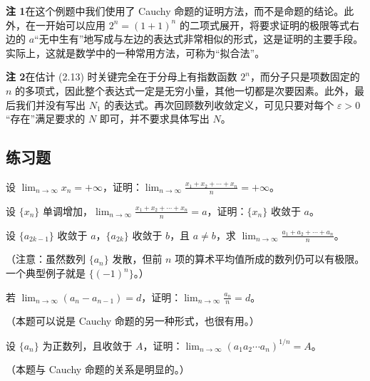 \begin{xremark}
\textbf{注 1}\quad 在这个例题中我们使用了 Cauchy 命题的证明方法，而不是命题的结论。此外，在一开始可以应用 $2^n=(1+1)^n$ 的二项式展开，将要求证明的极限等式右边的 $a$“无中生有”地写成与左边的表达式非常相似的形式，这是证明的主要手段。实际上，这就是数学中的一种常用方法，可称为“拟合法”。

\textbf{注 2}\quad 在估计 (2.13) 时关键完全在于分母上有指数函数 $2^n$，而分子只是项数固定的 $n$ 的多项式，因此整个表达式一定是无穷小量，其他一切都是次要因素。此外，最后我们并没有写出 $N_1$ 的表达式。再次回顾数列收敛定义，可见只要对每个 $\varepsilon>0$“存在”满足要求的 $N$ 即可，并不要求具体写出 $N$。
\end{xremark}

\subsection{练习题}

\begin{xexercise}[1]
设 $\displaystyle\lim_{n\to\infty}x_n=+\infty$，证明：$\displaystyle\lim_{n\to\infty}\frac{x_1+x_2+\cdots+x_n}{n}=+\infty$。
\end{xexercise}

\begin{xexercise}[2]
设 $\{x_n\}$ 单调增加，$\displaystyle\lim_{n\to\infty}\frac{x_1+x_2+\cdots+x_n}{n}=a$，证明：$\{x_n\}$ 收敛于 $a$。
\end{xexercise}

\begin{xexercise}[3]
设 $\{a_{2k-1}\}$ 收敛于 $a$，$\{a_{2k}\}$ 收敛于 $b$，且 $a\ne b$，求 $\displaystyle\lim_{n\to\infty}\frac{a_1+a_2+\cdots+a_n}{n}$。

  （注意：虽然数列 $\{a_n\}$ 发散，但前 $n$ 项的算术平均值所成的数列仍可以有极限。一个典型例子就是 $\{(-1)^n\}$。）
\end{xexercise}

\begin{xexercise}[4]
若 $\displaystyle\lim_{n\to\infty}(a_n-a_{n-1})=d$，证明：$\displaystyle\lim_{n\to\infty}\frac{a_n}{n}=d$。

  （本题可以说是 Cauchy 命题的另一种形式，也很有用。）
\end{xexercise}

\begin{xexercise}[5]
设 $\{a_n\}$ 为正数列，且收敛于 $A$，证明：$\displaystyle\lim_{n\to\infty}(a_1a_2\cdots a_n)^{1/n}=A$。

  （本题与 Cauchy 命题的关系是明显的。）
\end{xexercise}

